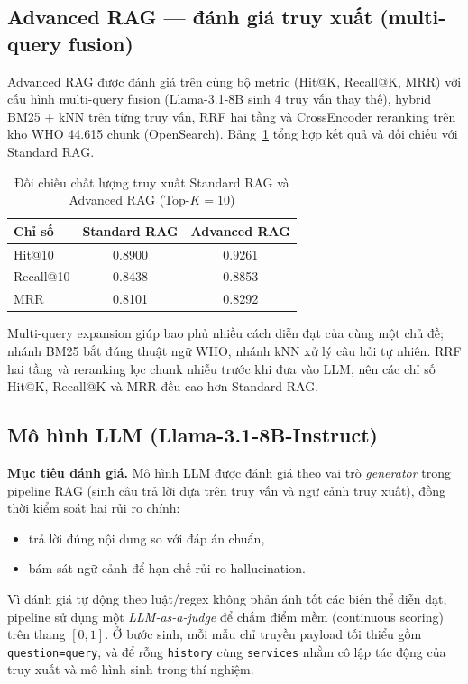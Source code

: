 \subsection{Advanced RAG --- đánh giá truy xuất (multi-query fusion)}

Advanced RAG được đánh giá trên cùng bộ metric (Hit@K, Recall@K, MRR) với cấu hình multi-query fusion (Llama-3.1-8B sinh 4 truy vấn thay thế), hybrid BM25 + kNN trên từng truy vấn, RRF hai tầng và CrossEncoder reranking trên kho WHO 44.615 chunk (OpenSearch). Bảng~\ref{tab:rag_advanced_results} tổng hợp kết quả và đối chiếu với Standard RAG.

\begin{table}[H]
\centering
\begin{tabular}{|l|c|c|}
\hline
\textbf{Chỉ số} & \textbf{Standard RAG} & \textbf{Advanced RAG} \\
\hline
Hit@10 & 0.8900 & 0.9261 \\
\hline
Recall@10 & 0.8438 & 0.8853 \\
\hline
MRR & 0.8101 & 0.8292 \\
\hline
\end{tabular}
\caption{Đối chiếu chất lượng truy xuất Standard RAG và Advanced RAG (Top-$K=10$)}
\label{tab:rag_advanced_results}
\end{table}

Multi-query expansion giúp bao phủ nhiều cách diễn đạt của cùng một chủ đề; nhánh BM25 bắt đúng thuật ngữ WHO, nhánh kNN xử lý câu hỏi tự nhiên. RRF hai tầng và reranking lọc chunk nhiễu trước khi đưa vào LLM, nên các chỉ số Hit@K, Recall@K và MRR đều cao hơn Standard RAG.

\subsection{Mô hình LLM (Llama-3.1-8B-Instruct)}

\textbf{Mục tiêu đánh giá.} Mô hình LLM được đánh giá theo vai trò \textit{generator} trong pipeline RAG (sinh câu trả lời dựa trên truy vấn và ngữ cảnh truy xuất), đồng thời kiểm soát hai rủi ro chính: 
\begin{itemize}
    \item trả lời đúng nội dung so với đáp án chuẩn, 
    \item bám sát ngữ cảnh để hạn chế rủi ro hallucination. 
\end{itemize}
Vì đánh giá tự động theo luật/regex không phản ánh tốt các biến thể diễn đạt, pipeline sử dụng một \textit{LLM-as-a-judge} để chấm điểm mềm (continuous scoring) trên thang \( [0,1] \). Ở bước sinh, mỗi mẫu chỉ truyền payload tối thiểu gồm \texttt{question=query}, và để rỗng \texttt{history} cùng \texttt{services} nhằm cô lập tác động của truy xuất và mô hình sinh trong thí nghiệm.


